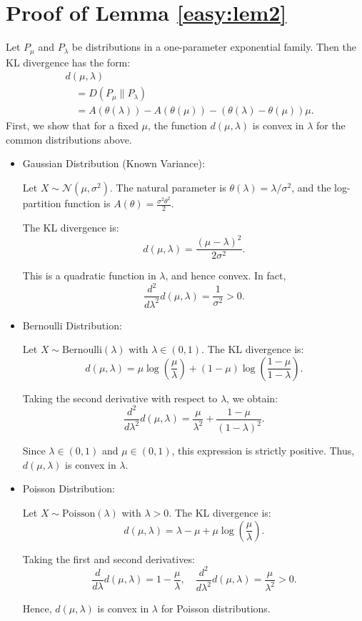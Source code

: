 \documentclass[final]{IEEEtran}
\newcommand{\nn}{\nonumber}
\begin{document}
\appendices 
\section{Proof of Lemma \ref{easy:lem2}} \label{easylem2proof}
Let $P_{\mu}$ and $P_{\lambda}$ be distributions in a one-parameter exponential family. Then the KL divergence has the form:
\begin{align}
&d(\mu,\lambda)\nn\\
&\quad =D(P_{\mu}\|P_{\lambda})\\
&\quad =A(\theta(\lambda))-A(\theta(\mu))-(\theta(\lambda)-\theta(\mu))\mu.
\end{align} 
First, we show that for a fixed $\mu$, the function $d(\mu,\lambda)$ is convex in $\lambda$ for the common distributions above. 
\begin{itemize}
\item Gaussian Distribution (Known Variance):

Let $X \sim \mathcal{N}(\mu, \sigma^2)$. The natural parameter is $\theta(\lambda) = \lambda/\sigma^2$, and the log-partition function is $A(\theta) = \frac{\sigma^2 \theta^2}{2}$.

The KL divergence is:
\[
d(\mu, \lambda) = \frac{(\mu - \lambda)^2}{2\sigma^2}.
\]

This is a quadratic function in $\lambda$, and hence convex. In fact,
\[
\frac{d^2}{d\lambda^2} d(\mu, \lambda) = \frac{1}{\sigma^2} > 0.
\]

\item Bernoulli Distribution:

Let $X \sim \text{Bernoulli}(\lambda)$ with $\lambda \in (0,1)$. The KL divergence is:
\[
d(\mu, \lambda) = \mu \log\left(\frac{\mu}{\lambda}\right) + (1-\mu) \log\left(\frac{1-\mu}{1-\lambda}\right).
\]

Taking the second derivative with respect to $\lambda$, we obtain:
\[
\frac{d^2}{d\lambda^2} d(\mu, \lambda) = \frac{\mu}{\lambda^2} + \frac{1 - \mu}{(1 - \lambda)^2}.
\]

Since $\lambda \in (0,1)$ and $\mu \in (0,1)$, this expression is strictly positive. Thus, $d(\mu, \lambda)$ is convex in $\lambda$.

\item Poisson Distribution:

Let $X \sim \text{Poisson}(\lambda)$ with $\lambda > 0$. The KL divergence is:
\[
d(\mu, \lambda) = \lambda - \mu + \mu \log\left(\frac{\mu}{\lambda}\right).
\]

Taking the first and second derivatives:
\[
\frac{d}{d\lambda} d(\mu, \lambda) = 1 - \frac{\mu}{\lambda}, \quad \frac{d^2}{d\lambda^2} d(\mu, \lambda) = \frac{\mu}{\lambda^2} > 0.
\]

Hence, $d(\mu, \lambda)$ is convex in $\lambda$ for Poisson distributions.

\end{itemize}
\end{document}
